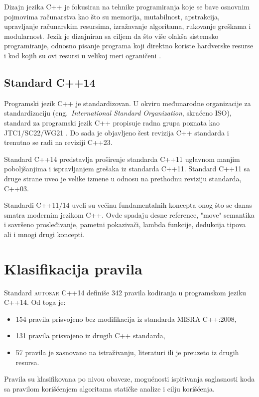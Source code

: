 \documentclass[12pt,oneside]{memoir}
\begin{document}
Dizajn jezika C++ je fokusiran na tehnike programiranja koje se bave osnovnim pojmovima ra\v{c}unarstva kao \v{s}to su memorija, mutabilnost, apstrakcija, upravljanje ra\v{c}unarskim resursima, izra\v{z}avanje algoritama, rukovanje gre\v{s}kama i modularnost. Jezik je dizajniran sa ciljem da \v{s}to vi\v{s}e olak\v{s}a sistemsko programiranje, odnosno pisanje programa koji direktno koriste hardverske resurse i kod kojih su ovi resursi u velikoj meri ograni\v{c}eni \cite{TheC++ProgrammingLanguage}.


\subsection{Standard C++14}

Programski jezik C++ je standardizovan. U okviru međunarodne organizacije za standardizaciju (eng.~\textit{International Standard Organization}, skra\'{c}eno ISO), standard za programski jezik C++ propisuje radna grupa poznata kao JTC1/SC22/WG21 \cite{ISOWebsite}. Do sada je objavljeno \v{s}est revizija C++ standarda i trenutno se radi na reviziji C++23. 
\indent

Standard C++14 predstavlja pro\v{s}irenje standarda C++11 uglavnom manjim pobolj\v{s}anjima i ispravljanjem gre\v{s}aka iz standarda C++11. Standard C++11 sa druge strane uveo je velike izmene u odnosu na prethodnu reviziju standarda, C++03. \par
Standardi C++11/14 uveli su ve\'{c}inu fundamentalnih koncepta onog \v{s}to se danas smatra modernim jezikom C++. Ovde spadaju desne reference, "move" semantika i savr\v{s}eno prosleđivanje, pametni pokaziva\v{c}i, lambda funkcije, dedukcija tipova ali i mnogi drugi koncepti.

\section{Klasifikacija pravila}
Standard \textsc{autosar} C++14 definiše 342 pravila kodiranja u programskom jeziku C++14. Od toga je:
\begin{itemize}
  \item {154 pravila prisvojeno bez modifikacija iz standarda MISRA C++:2008,}
  \item {131 pravila prisvojeno iz drugih C++ standarda,}
  \item {57 pravila je zasnovano na istraživanju, literaturi ili je preuzeto iz drugih resursa.}
\end{itemize}
Pravila su klasifikovana po nivou obaveze, mogućnosti ispitivanja saglasnosti koda sa pravilom korišćenjem algoritama
statičke analize i cilju korišćenja.
\end{document}
